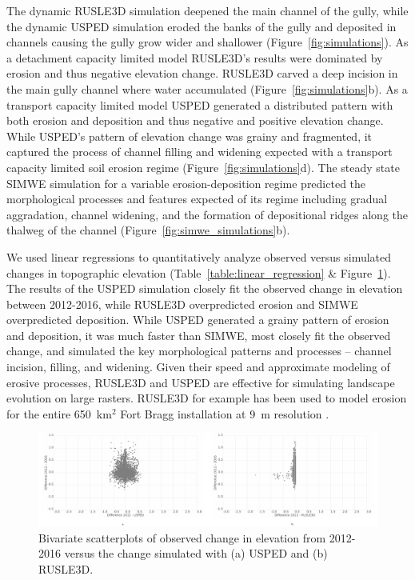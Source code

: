 \documentclass[gmd, manuscript]{copernicus}
\begin{document}
The dynamic RUSLE3D simulation
deepened the main channel of the gully,
while the dynamic USPED simulation
eroded the banks of the gully
and deposited in channels
causing the gully grow wider and shallower
(Figure~\ref{fig:simulations}). 
As a detachment capacity limited model
RUSLE3D's results were
dominated by erosion and 
thus negative elevation change.
RUSLE3D carved a deep incision 
in the main gully channel
where water accumulated
(Figure~\ref{fig:simulations}b). 
As a transport capacity limited model
USPED generated a distributed pattern
with both erosion and deposition and thus
negative and positive elevation change.
While USPED's pattern of elevation change
was grainy and fragmented, 
it captured the process of channel 
filling and widening expected with 
a transport capacity limited soil erosion regime
(Figure~\ref{fig:simulations}d). 
The steady state SIMWE simulation
for a variable erosion-deposition regime
predicted the morphological processes and features
expected of its regime including
gradual aggradation,
channel widening,
and the formation of depositional ridges
along the thalweg of the channel
(Figure~\ref{fig:simwe_simulations}b).

We used linear regressions to quantitatively analyze 
observed versus simulated changes in topographic elevation
(Table~\ref{table:linear_regression} \& Figure~\ref{fig:scatterplots}).
The results of the USPED simulation closely fit
the observed change in elevation between 2012-2016,
while RUSLE3D overpredicted erosion and 
SIMWE overpredicted deposition.
While USPED generated a grainy pattern of erosion and deposition,
it was much faster than SIMWE, most closely fit the observed change,
and simulated the key morphological patterns and processes -- 
channel incision, filling, and widening. 
Given their speed
and approximate modeling of erosive processes, 
RUSLE3D and USPED 
are effective for simulating landscape evolution
on large rasters.
RUSLE3D for example has been used to
model erosion for the entire 650~\unit{km}$^{2}$ 
Fort Bragg installation at 9~\unit{m} resolution
\citep{Levine2018}. 


\begin{figure}
\center
\includegraphics[width=\textwidth,height=0.925\textheight,keepaspectratio]{figures/scatterplots.pdf}
\caption{Bivariate scatterplots of observed change in elevation from 2012-2016
versus the change simulated with 
(a) USPED and 
(b) RUSLE3D.}
\label{fig:scatterplots}
\end{figure}
\end{document}
